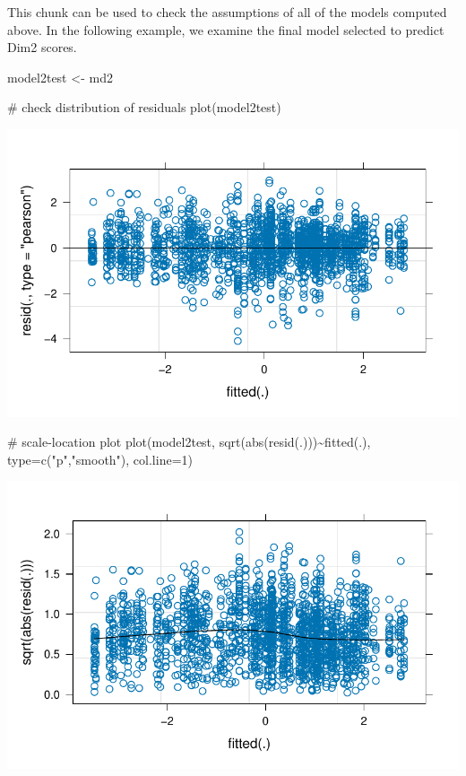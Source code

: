 \documentclass[
  letterpaper,
  DIV=11,
  numbers=noendperiod]{scrreprt}
\newenvironment{Shaded}{\begin{snugshade}}{\end{snugshade}}
\newcommand{\AttributeTok}[1]{\textcolor[rgb]{0.40,0.45,0.13}{#1}}
\newcommand{\CommentTok}[1]{\textcolor[rgb]{0.37,0.37,0.37}{#1}}
\newcommand{\DecValTok}[1]{\textcolor[rgb]{0.68,0.00,0.00}{#1}}
\newcommand{\FunctionTok}[1]{\textcolor[rgb]{0.28,0.35,0.67}{#1}}
\newcommand{\NormalTok}[1]{\textcolor[rgb]{0.00,0.23,0.31}{#1}}
\newcommand{\OtherTok}[1]{\textcolor[rgb]{0.00,0.23,0.31}{#1}}
\newcommand{\SpecialCharTok}[1]{\textcolor[rgb]{0.37,0.37,0.37}{#1}}
\newcommand{\StringTok}[1]{\textcolor[rgb]{0.13,0.47,0.30}{#1}}
\begin{document}
This chunk can be used to check the assumptions of all of the models
computed above. In the following example, we examine the final model
selected to predict Dim2 scores.

\begin{Shaded}
\begin{Highlighting}[]
\NormalTok{model2test }\OtherTok{\textless{}{-}}\NormalTok{ md2}

\CommentTok{\# check distribution of residuals}
\FunctionTok{plot}\NormalTok{(model2test)}
\end{Highlighting}
\end{Shaded}

\includegraphics{AppendixF_files/figure-pdf/lmer-diagnostics-1.pdf}

\begin{Shaded}
\begin{Highlighting}[]
\CommentTok{\# scale{-}location plot}
\FunctionTok{plot}\NormalTok{(model2test,}
     \FunctionTok{sqrt}\NormalTok{(}\FunctionTok{abs}\NormalTok{(}\FunctionTok{resid}\NormalTok{(.)))}\SpecialCharTok{\textasciitilde{}}\FunctionTok{fitted}\NormalTok{(.),}
     \AttributeTok{type=}\FunctionTok{c}\NormalTok{(}\StringTok{"p"}\NormalTok{,}\StringTok{"smooth"}\NormalTok{), }\AttributeTok{col.line=}\DecValTok{1}\NormalTok{)}
\end{Highlighting}
\end{Shaded}

\includegraphics{AppendixF_files/figure-pdf/lmer-diagnostics-2.pdf}
\end{document}
